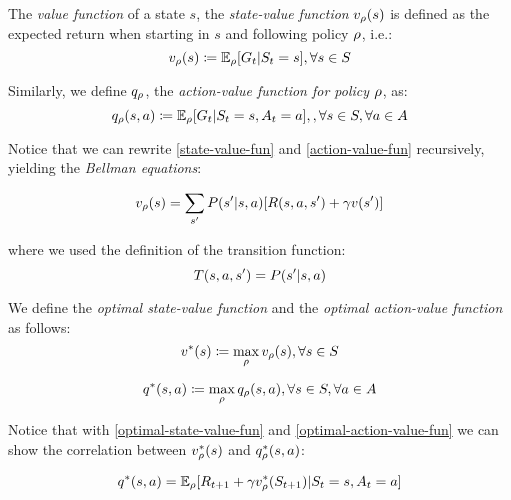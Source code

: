 The \emph{value function} of a state $s$, the \emph{state-value function} $v_\rho(s)$ is defined as the expected return when starting in $s$ and following policy $\rho$, i.e.:
\begin{equation}
\label{state-value-fun}
v_\rho(s) \coloneqq \mathbb{E}_{\rho}[G_t | S_t = s], \forall s \in S
\end{equation}

Similarly, we define $q_\rho$, the \emph{action-value function for policy $\rho$}, as:
\begin{equation}
\label{action-value-fun}
q_\rho(s, a) \coloneqq \mathbb{E}_{\rho}[G_t | S_t = s, A_t = a], , \forall s \in S, \forall a \in A
\end{equation}

Notice that we can rewrite \ref{state-value-fun} and \ref{action-value-fun} recursively, yielding the \emph{Bellman equations}:

\begin{equation}
\label{bellman-state-value-fun}
v_\rho(s) =  \sum_{s'} P(s' | s,a)[R(s,a,s') + \gamma v(s')] 
\end{equation}

where we used the definition of the transition function:
\begin{equation}
T(s,a,s') = P(s' | s,a)
\end{equation}

We define the \emph{optimal state-value function} and the \emph{optimal action-value function} as follows:
\begin{equation}
\label{optimal-state-value-fun}
v^*(s)  \coloneqq \max_\rho  v_\rho(s), \forall s\in S		
\end{equation}

\begin{equation}
\label{optimal-action-value-fun}
q^*(s, a) \coloneqq \max_\rho  q_\rho(s, a), \forall s\in S, \forall a\in A
\end{equation}

Notice that with \ref{optimal-state-value-fun} and \ref{optimal-action-value-fun} we can show the correlation between $v^*_\rho(s)$ and $q^*_\rho(s, a)$:

\begin{equation}
q^*(s, a) = \mathbb{E}_\rho[R_{t+1} + \gamma v^*_\rho(S_{t+1})| S_t = s, A_t = a]
\end{equation}


